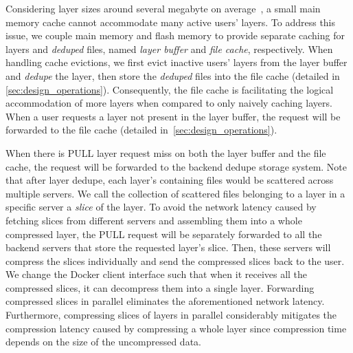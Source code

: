 Considering layer sizes around several megabyte on average~\cite{dockerworkload}, 
a small main memory cache cannot accommodate many active users' layers.
To address this issue, we couple main memory and flash memory to provide separate caching for layers and \emph{deduped} files, named \emph{layer buffer} and \emph{file cache}, respectively.
When handling cache evictions, we first evict inactive users' layers from the layer buffer and \emph{dedupe} the layer, then store the \emph{deduped} files into the file cache (detailed in \cref{sec:design_operations}). 
Consequently, the file cache is facilitating the logical accommodation of more layers when compared to only naively caching layers.
When a user requests a layer not present in the layer buffer, the request will be forwarded to the file cache (detailed in~\cref{sec:design_operations}). 

When there is PULL layer request miss on both the layer buffer and the file cache, the request will be forwarded to the backend dedupe storage system.
Note that after layer dedupe, each layer's containing files would be scattered across multiple servers. 
We call the collection of scattered files belonging to a layer in a specific server a \emph{slice} of the layer.
To avoid the network latency caused by fetching slices from different servers and assembling them into a whole compressed layer,
the PULL request will be separately forwarded to all the backend servers that store the requested layer's slice. 
Then, these servers will compress the slices individually and send the compressed slices back to the user.
We change the Docker client interface such that when it receives all the compressed slices, it can decompress them into a single layer.
Forwarding compressed slices in parallel eliminates the aforementioned network latency. 
Furthermore, compressing slices of layers in parallel considerably mitigates the compression latency caused by compressing a whole layer since compression time depends on the size of the uncompressed data.





 
